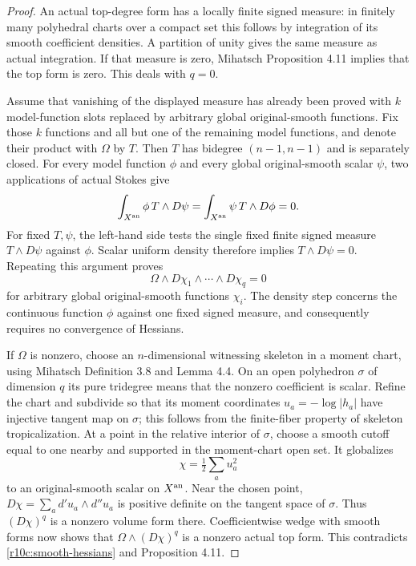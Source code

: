 \documentclass[11pt]{article}
\theoremstyle{definition}
\theoremstyle{remark}
\numberwithin{equation}{section}
\begin{document}
\begin{proof}
An actual top-degree form has a locally finite signed measure: in finitely
many polyhedral charts over a compact set this follows by integration of
its smooth coefficient densities.  A partition of unity gives the same
measure as actual integration.  If that measure is zero, Mihatsch
Proposition 4.11 implies that the top form is zero.  This deals with $q=0$.

Assume that vanishing of the displayed measure has already been proved
with $k$ model-function slots replaced by arbitrary global original-smooth
functions.  Fix those $k$ functions and all but one of the remaining
model functions, and denote their product with $\Omega$ by $T$.
Then $T$ has bidegree $(n-1,n-1)$ and is separately closed.  For every
model function $\phi$ and every global original-smooth scalar $\psi$,
two applications of actual Stokes give
\[
 \int_{X^{\rm an}}\phi\,T\wedge D\psi
     =\int_{X^{\rm an}}\psi\,T\wedge D\phi=0.
\]
For fixed $T,\psi$, the left-hand side tests the single fixed finite
signed measure $T\wedge D\psi$ against $\phi$.  Scalar uniform density
therefore implies $T\wedge D\psi=0$.  Repeating this argument proves
\[
          \Omega\wedge D\chi_1\wedge\cdots\wedge D\chi_q=0
\tag{D}\label{r10c:smooth-hessians}
\]
for arbitrary global original-smooth functions $\chi_i$.
The density step concerns the continuous function \(\phi\) against one fixed signed measure, and consequently requires no convergence of Hessians.

If $\Omega$ is nonzero, choose an $n$-dimensional witnessing skeleton
in a moment chart, using Mihatsch Definition 3.8 and Lemma 4.4.
On an open polyhedron $\sigma$ of dimension $q$ its pure tridegree
means that the nonzero coefficient is scalar.  Refine the chart and
subdivide so that its moment coordinates $u_a=-\log|h_a|$ have
injective tangent map on $\sigma$; this follows from the finite-fiber
property of skeleton tropicalization.  At a point in the relative
interior of $\sigma$, choose a smooth cutoff equal to one nearby and
supported in the moment-chart open set.  It globalizes
\[
                         \chi=\tfrac12\sum_a u_a^2
\]
to an original-smooth scalar on $X^{\rm an}$.  Near the chosen point,
$D\chi=\sum_a d'u_a\wedge d''u_a$ is positive definite on the tangent
space of $\sigma$.  Thus $(D\chi)^q$ is a nonzero volume form there.
Coefficientwise wedge with smooth forms now shows that
$\Omega\wedge(D\chi)^q$ is a nonzero actual top form.  This contradicts
\eqref{r10c:smooth-hessians} and Proposition 4.11.
\end{proof}
\end{document}
